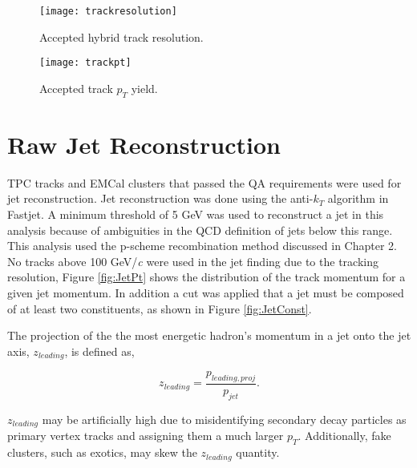 \begin{figure}[h]
\texttt{[image: trackresolution]}
\centering
\caption{Accepted hybrid track resolution.}
\label{fig:trackresolution}
\end{figure}

\begin{figure}[h]
\texttt{[image: trackpt]}
\centering
\caption{Accepted track $p_{T}$ yield.}
\label{fig:hybtrackpt}
\end{figure}


\section{Raw Jet Reconstruction}

TPC tracks and EMCal clusters that passed the QA requirements were used for jet reconstruction. Jet reconstruction was done using the anti-$k_{T}$ algorithm in Fastjet.  A minimum threshold of 5 GeV was used to reconstruct a jet in this analysis because of ambiguities in the QCD definition of jets below this range.  This analysis used the p-scheme recombination method discussed in Chapter 2. No tracks above 100 GeV/\textit{c} were used in the jet finding due to the tracking resolution, Figure \ref{fig:JetPt} shows the distribution of the track momentum for a given jet momentum.  In addition a cut was applied that a jet must be composed of at least two constituents, as shown in Figure \ref{fig:JetConst}.


The projection of the the most energetic hadron's momentum in a jet onto the jet axis, $z_{leading}$, is defined as,

\begin{equation}
z_{leading} = \frac{ p_{leading, proj} }{ p_{jet} }.
\label{eq:zleading}
\end{equation}

\noindent
$z_{leading}$ may be artificially high due to misidentifying secondary decay particles as primary vertex tracks and assigning them a much larger $p_{T}$.  Additionally, fake clusters, such as exotics, may skew the $z_{leading}$ quantity.  

